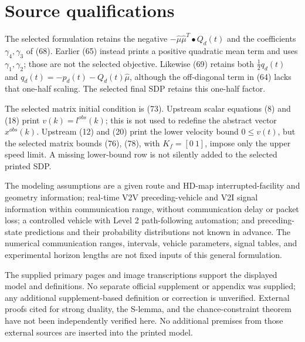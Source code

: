 \documentclass[10pt]{article}
\begin{document}
\section*{Source qualifications}
The selected formulation retains the negative \(-\hat\mu\hat\mu^T\bullet Q_d(t)\) and the coefficients \(\gamma_4,\gamma_3\) of (68). Earlier (65) instead prints a positive quadratic mean term and uses \(\gamma_1,\gamma_2\); those are not the selected objective. Likewise (69) retains both \(\tfrac12q_d(t)\) and \(q_d(t)=-p_d(t)-Q_d(t)\hat\mu\), although the off-diagonal term in (64) lacks that one-half scaling. The selected final SDP retains this one-half factor.

The selected matrix initial condition is (73). Upstream scalar equations (8) and (18) print \(v(k)=l^{obs}(k)\); this is not used to redefine the abstract vector \(x^{obs}(k)\). Upstream (12) and (20) print the lower velocity bound \(0\leq v(t)\), but the selected matrix bounds (76), (78), with \(K_f=[0\ 1]\), impose only the upper speed limit. A missing lower-bound row is not silently added to the selected printed SDP.

The modeling assumptions are a given route and HD-map interrupted-facility and geometry information; real-time V2V preceding-vehicle and V2I signal information within communication range, without communication delay or packet loss; a controlled vehicle with Level 2 path-following automation; and preceding-state predictions and their probability distributions not known in advance. The numerical communication ranges, intervals, vehicle parameters, signal tables, and experimental horizon lengths are not fixed inputs of this general formulation.

The supplied primary pages and image transcriptions support the displayed model and definitions. No separate official supplement or appendix was supplied; any additional supplement-based definition or correction is unverified. External proofs cited for strong duality, the S-lemma, and the chance-constraint theorem have not been independently verified here. No additional premises from those external sources are inserted into the printed model.
\end{document}
